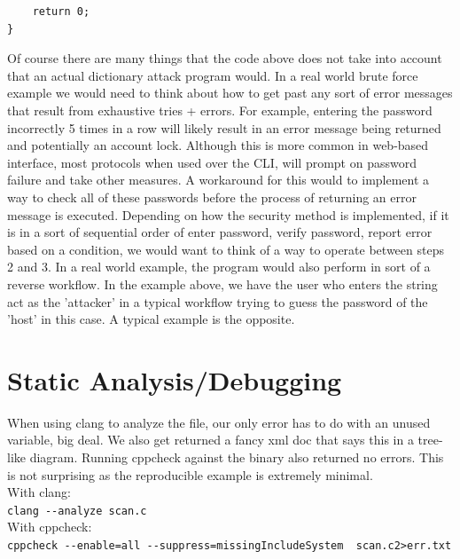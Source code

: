 \documentclass[12pt, letterpaper]{article}
\begin{document}
\begin{sloppypar}
\begin{flushleft}
\begin{lstlisting}
    return 0;
}
\end{lstlisting}
Of course there are many things that the code above does not take into account that an 
actual dictionary attack program would. In a real world brute force example we would need
to think about how to get past any sort of error messages that result from exhaustive 
tries + errors. For example, entering the password incorrectly 5 times in a row will likely 
result in an error message being returned and potentially an account lock. Although this is 
more common in web-based interface, most protocols when used over the CLI, will prompt on 
password failure and take other measures. A workaround for this would to implement a way to
check all of these passwords before the process of returning an error message is executed. 
Depending on how the security method is implemented, if it is in a sort of sequential order
of enter password, verify password, report error based on a condition, we would want to think
of a way to operate between steps 2 and 3. In a real world example, the program would also 
perform in sort of a reverse workflow. In the example above, we have the user who enters the
string act as the 'attacker' in a typical workflow trying to guess the password of the 
'host' in this case. A typical example is the opposite. 

\section*{Static Analysis/Debugging}
When using clang to analyze the file, our only error has to do with an unused variable, 
big deal. We also get returned a fancy xml doc that says this in a tree-like diagram. 
Running cppcheck against the binary also returned no errors. This is not surprising as the
reproducible example is extremely minimal. \\

With clang: \\
\verb|clang --analyze scan.c| \\

With cppcheck: \\
\verb|cppcheck --enable=all --suppress=missingIncludeSystem  scan.c2>err.txt | \\


\end{flushleft}
\end{sloppypar}
\end{document}
